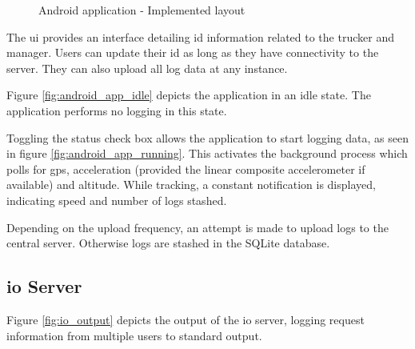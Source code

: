 \begin{figure}[H]
{        \label{fig:android_app_background}
    }
\caption{Android application - Implemented layout}
\label{fig:android_app_implementation}
\end{figure}

The \ac{ui} provides an interface detailing \ac{id} information related to the trucker and manager.
Users can update their \ac{id} as long as they have connectivity to the server.
They can also upload all log data at any instance.

Figure \ref{fig:android_app_idle} depicts the application in an idle state.
The application performs no logging in this state.

Toggling the status check box allows the application to start logging data, as seen in figure \ref{fig:android_app_running}.
This activates the background process which polls for \ac{gps}, acceleration (provided the linear composite accelerometer if available) and altitude.
While tracking, a constant notification is displayed, indicating speed and number of logs stashed.

Depending on the upload frequency, an attempt is made to upload logs to the central server.
Otherwise logs are stashed in the SQLite database.

\subsection{\Ac{io} Server}
Figure \ref{fig:io_output} depicts the output of the \ac{io} server, logging request information from multiple users to standard output.

